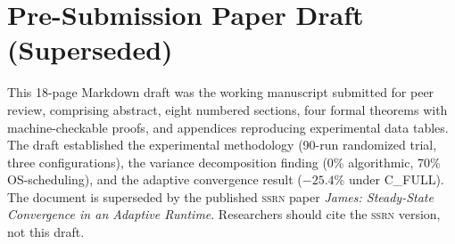
\section*{Pre-Submission Paper Draft (Superseded)}

This 18-page Markdown draft was the working manuscript submitted for peer
review, comprising abstract, eight numbered sections, four formal theorems with
machine-checkable proofs, and appendices reproducing experimental data tables.
The draft established the experimental methodology (90-run randomized trial,
three configurations), the variance decomposition finding (0\% algorithmic,
70\% OS-scheduling), and the adaptive convergence result ($-25.4\%$ under
C\_FULL). The document is superseded by the published \textsc{ssrn} paper
\textit{James: Steady-State Convergence in an Adaptive Runtime}. Researchers
should cite the \textsc{ssrn} version, not this draft.
